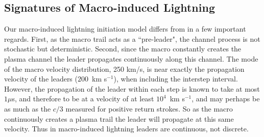 \documentclass[%
 reprint,
 amsmath,amssymb,
 aps,
]{revtex4-2}
\newcommand{\vtwo}[1]{{\color{red} #1}}
\begin{document}

    \subsection{Signatures of Macro-induced Lightning} %
    \label{sec:signatures_of_macro_induced_lightning}

        Our macro-induced lightning initiation model differs from \vtwo{\citet{DwyerUman2014}} in a few important regards. First, as the macro trail acts as a ``pre-leader", the channel process is not stochastic but deterministic. Second, since the macro constantly creates the plasma channel the leader propagates continuously along this channel. The mode of the macro velocity distribution, 250 km/s, is near exactly the propagation velocity of the leaders ($200\,$ km s$^{-1}$), when including the \vtwo{interstep} interval. However, the propagation of the leader within each step is known to take at most $1\mu$s, and therefore to be at a velocity of at least $10^4\,$ km s$^{-1}$, and may perhaps be as much as the $c/3$ measured for positive return strokes. So as the macro continuously creates a plasma trail the leader will propagate at this same velocity. Thus in macro-induced lightning leaders are continuous, not discrete.
\end{document}
